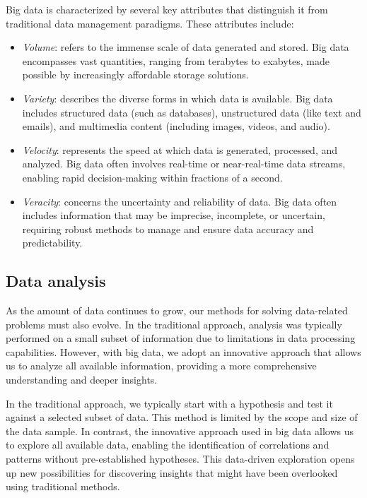 Big data is characterized by several key attributes that distinguish it from traditional data management paradigms. 
These attributes include:
\begin{itemize}
    \item \textit{Volume}: refers to the immense scale of data generated and stored. 
        Big data encompasses vast quantities, ranging from terabytes to exabytes, made possible by increasingly affordable storage solutions.
    \item \textit{Variety}: describes the diverse forms in which data is available. 
        Big data includes structured data (such as databases), unstructured data (like text and emails), and multimedia content (including images, videos, and audio).
    \item \textit{Velocity}: represents the speed at which data is generated, processed, and analyzed. 
        Big data often involves real-time or near-real-time data streams, enabling rapid decision-making within fractions of a second.
    \item \textit{Veracity}: concerns the uncertainty and reliability of data. 
        Big data often includes information that may be imprecise, incomplete, or uncertain, requiring robust methods to manage and ensure data accuracy and predictability.
\end{itemize}   

\subsection{Data analysis}
As the amount of data continues to grow, our methods for solving data-related problems must also evolve. 
In the traditional approach, analysis was typically performed on a small subset of information due to limitations in data processing capabilities. 
However, with big data, we adopt an innovative approach that allows us to analyze all available information, providing a more comprehensive understanding and deeper insights.

In the traditional approach, we typically start with a hypothesis and test it against a selected subset of data. 
This method is limited by the scope and size of the data sample.
In contrast, the innovative approach used in big data allows us to explore all available data, enabling the identification of correlations and patterns without pre-established hypotheses.
This data-driven exploration opens up new possibilities for discovering insights that might have been overlooked using traditional methods.
